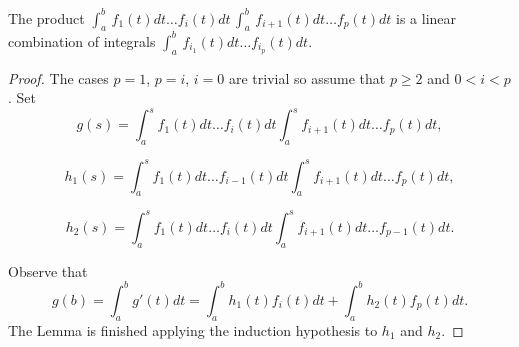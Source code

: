 \documentclass[10pt,a4paper]{amsart}
\begin{document}
\begin{lemma}\label{real}
The product $\int_a^b\, f_1(t)dt\ldots f_i(t)dt\,  \int_a^b\, f_{i+1}(t)dt\ldots f_p(t)dt$ is a linear combination of integrals 
$\int_a^b\, f_{i_1}(t)dt\ldots f_{i_p}(t)dt$.
\end{lemma}

\begin{proof}
The cases $p=1$, $p=i$, $i=0$ are trivial so assume that $p\geq 2$ and $0<i<p$. Set 
\[g(s)=\int_a^s f_1(t)dt\ldots f_i(t)dt  \int_a^s f_{i+1}(t)dt\ldots f_p(t)dt,\]


\[h_1(s)=\int_a^s f_1(t)dt\ldots f_{i-1}(t)dt  \int_a^s f_{i+1}(t)dt\ldots f_p(t)dt,\]


\[h_2(s)=\int_a^s f_1(t)dt\ldots f_i(t)dt  \int_a^s f_{i+1}(t)dt\ldots f_{p-1}(t)dt.\]


Observe that
\[g(b)=\int_a^b g'(t)dt= \int_a^b h_1(t) f_i(t)dt  +   \int_a^b h_2(t) f_p(t)dt. \]
The Lemma is finished applying the induction hypothesis to $h_1$ and $h_2$.
\end{proof}
\end{document}
